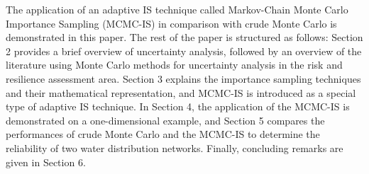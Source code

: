     The application of an adaptive IS technique called Markov-Chain Monte Carlo Importance Sampling (MCMC-IS) in comparison with crude Monte Carlo is demonstrated in this paper. The rest of the paper is structured as follows: Section 2 provides a brief overview of uncertainty analysis, followed by an overview of the literature using Monte Carlo methods for uncertainty analysis in the risk and resilience assessment area. Section 3 explains the importance sampling techniques and their mathematical representation, and MCMC-IS is introduced as a special type of adaptive IS technique. In Section 4, the application of the MCMC-IS is demonstrated on a one-dimensional example, and Section 5 compares the performances of crude Monte Carlo and the MCMC-IS to determine the reliability of two water distribution networks. Finally, concluding remarks are given in Section 6.

